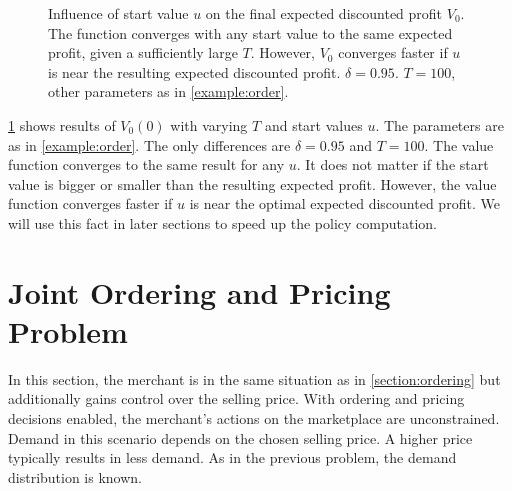 \begin{figure}[t]
	\caption[Effect of Start Value on Convergence of Value Function]{Influence of start value $u$ on the final expected discounted profit $V_0$. The function converges with any start value to the same expected profit, given a sufficiently large $T$. However, $V_0$ converges faster if $u$ is near the resulting expected discounted profit. $\delta=0.95$. $T=100$, other parameters as in \cref{example:order}.}
	\label{fig:convergence}
\end{figure}

\cref{fig:convergence} shows results of $V_0(0)$ with varying $T$ and start values $u$.
The parameters are as in \cref{example:order}.
The only differences are $\delta = 0.95$ and $T = 100$.
The value function converges to the same result for any $u$.
It does not matter if the start value is bigger or smaller than the resulting expected profit.
However, the value function converges faster if $u$ is near the optimal expected discounted profit.
We will use this fact in later sections to speed up the policy computation.


\section{Joint Ordering and Pricing Problem}
\label{section:joint_ordering_pricing}
In this section, the merchant is in the same situation as in \cref{section:ordering} but additionally gains control over the selling price.
With ordering and pricing decisions enabled, the merchant's actions on the marketplace are unconstrained.
Demand in this scenario depends on the chosen selling price.
A higher price typically results in less demand.
As in the previous problem, the demand distribution is known.


